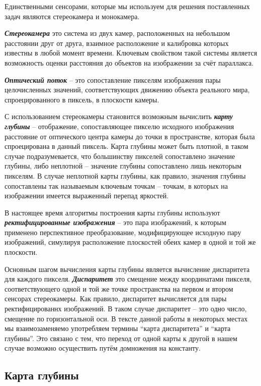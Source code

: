 \documentclass[aps,%
14pt,%
final,%
oneside,
onecolumn,%
musixtex, %
superscriptaddress,%
centertags]{extarticle} %
\begin{document}
Единственными сенсорами, которые мы используем для решения поставленных задач являются стереокамера и монокамера.

\textbf{\textit{Стереокамера}} это система из двух камер, расположенных на небольшом расстоянии друг от друга, взаимное расположение и калибровка которых известны в любой момент времени. Ключевым свойством такой системы является возможность оценки расстояния до объектов на изображении за счёт параллакса.

\textbf{\textit{Оптический поток}} -- это сопоставление пикселям изображения  пары целочисленных значений, соответствующих движению объекта реального мира, спроецированного в пиксель, в плоскости камеры.

С использованием стереокамеры становится возможным вычислить \textbf{\textit{карту глубины}} -- отображение, сопоставляющее пикселю исходного изображения расстояние от оптического центра камеры до точки в пространстве, которая была спроецирована в данный пиксель. Карта глубины может быть плотной, в таком случае подразумевается, что большинству пикселей сопоставлено значение глубины, либо неплотной -- значение глубины сопоставлено лишь некоторым пикселям. В случае неплотной карты глубины, как правило, значения глубины сопоставлены так называемым ключевым точкам -- точкам, в которых на изображении имеется выраженный перепад яркостей.

В настоящее время алгоритмы построения карты глубины используют \textbf{\textit{ректифицированные изображения}} -- это пара изображений, к которым применено перспективное преобразование, модифицирующее исходную пару изображений, симулируя расположение плоскостей обеих камер в одной и той же плоскости.

Основным шагом вычисления карты глубины является вычисление диспаритета для каждого пикселя. \textbf{\textit{Диспаритет}} это смещение между координатами пикселя, соответствующего одной и той же точке пространства на первом и втором сенсорах стереокамеры. Как правило, диспаритет вычисляется для пары ректифицированнх изображений. В таком случае диспаритет -- это одно число, смещение по горизонтальной оси. В тексте данной работы в некоторых местах мы взаимозаменяемо употребляем термины ``карта диспаритета'' и ``карта глубины''. Это связано с тем, что переход от одной карты к другой в нашем случае возможно осуществить путём домножения на константу.

\subsection{Карта глубины}
\end{document}
